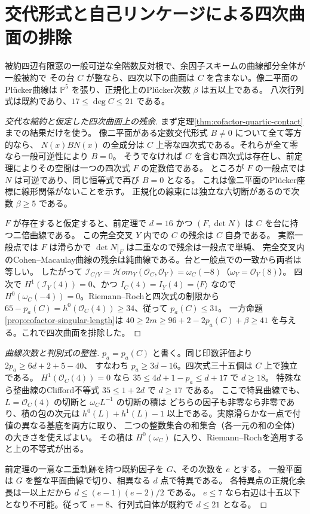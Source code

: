 \section{交代形式と自己リンケージによる四次曲面の排除}
\label{sec:cofactor-integral-octic}
\begin{theorem}\label{thm:cofactor-integral-octic}
被約四辺有限窓の一般可逆な全階数反対根で、余因子スキームの曲線部分全体が一般被約で
その台 $C$ が整なら、四次以下の曲面は $C$ を含まない。像二平面のPlücker曲線は
$\mathbb P^5$ を張り、正規化上のPlücker次数 $\beta$ は五以上である。
八次行列式は既約であり、$17\le\deg C\le21$ である。
\end{theorem}
\begin{proof}[交代な縮約と仮定した四次曲面上の残余]
まず定理\ref{thm:cofactor-quartic-contact}までの結果だけを使う。
像二平面がある定数交代形式 $B\ne0$ について全て等方的なら、
$N(x)BN(x)$ の全成分は $C$ 上零な四次式である。それらが全て零なら一般可逆性により $B=0$。
そうでなければ $C$ を含む四次式は存在し、前定理によりその空間は一つの四次式 $F$ の定数倍である。
ところが $F$ の一般点では $N$ は可逆であり、同じ恒等式で再び $B=0$ となる。
これは像二平面のPlücker座標に線形関係がないことを示す。
正規化の線束には独立な六切断があるので次数 $\beta\ge5$ である。

$F$ が存在すると仮定すると、前定理で $d=16$ かつ $(F,\det N)$ は $C$ を台に持つ二倍曲線である。
この完全交叉 $Y$ 内での $C$ の残余は $C$ 自身である。
実際一般点では $F$ は滑らかで $\det N|_F$ は二重なので残余は一般点で単純、
完全交叉内のCohen--Macaulay曲線の残余は純曲線である。台と一般点での一致から両者は等しい。
したがって $\mathcal I_{C/Y}=\mathcal Hom_Y(\mathcal O_C,\mathcal O_Y)
=\omega_C(-8)$（$\omega_Y=\mathcal O_Y(8)$）。
四次で $H^1(\mathcal I_Y(4))=0$、かつ $I_C(4)=I_Y(4)=\langle F\rangle$ なので
$H^0(\omega_C(-4))=0$。Riemann--Rochと四次式の制限から
$65-p_a(C)=h^0(\mathcal O_C(4))\ge34$、従って $p_a(C)\le31$。
一方命題\ref{prop:cofactor-singular-length}は
$40\ge2m\ge96+2-2p_a(C)+\beta\ge41$ を与える。これで四次曲面を排除した。
\end{proof}

\begin{proof}[曲線次数と判別式の整性]
$p_a=p_a(C)$ と書く。同じ印数評価より $2p_a\ge6d+2+5-40$、
すなわち $p_a\ge3d-16$。四次式三十五個は $C$ 上で独立である。
$H^1(\mathcal O_C(4))=0$ なら $35\le4d+1-p_a\le d+17$ で $d\ge18$。
特殊なら整曲線のClifford不等式 $35\le1+2d$ で $d\ge17$ である。
ここで特異曲線でも、$L=\mathcal O_C(4)$ の切断と $\omega_C L^{-1}$ の切断の積は
どちらの因子も非零なら非零であり、積の包の次元は
$h^0(L)+h^1(L)-1$ 以上である。実際滑らかな一点で付値の異なる基底を両方に取り、
二つの整数集合の和集合（各一元の和の全体）の大きさを使えばよい。
その積は $H^0(\omega_C)$ に入り、Riemann--Rochを適用すると上の不等式が出る。

前定理の一意な二重軌跡を持つ既約因子を $G$、その次数を $e$ とする。
一般平面は $G$ を整な平面曲線で切り、相異なる $d$ 点で特異である。
各特異点の正規化余長は一以上だから $d\le(e-1)(e-2)/2$ である。
$e\le7$ なら右辺は十五以下となり不可能。従って $e=8$、行列式自体が既約で $d\le21$ となる。
\end{proof}
